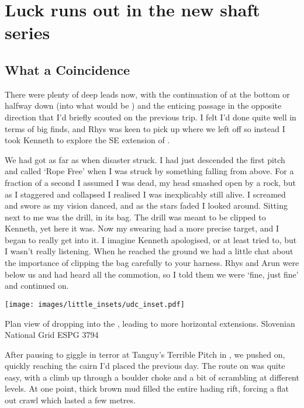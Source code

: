 \section{Luck runs out in the new shaft series}

\subsection{What a Coincidence}
There were plenty of deep leads now, with the continuation of  at the bottom or halfway down (into what would be ) and the enticing passage in the opposite direction that I’d briefly scouted on the previous trip. I felt I’d done quite well in terms of big finds, and Rhys was keen to pick up where we left off so instead I took Kenneth to explore the SE extension of .
 
We had got as far as  when disaster struck. I had just descended the first pitch and called ‘Rope Free’ when I was struck by something falling from above. For a fraction of a second I assumed I was dead, my head smashed open by a rock, but as I staggered and collapsed I realised I was inexplicably still alive. I screamed and swore as my vision danced, and as the stars faded I looked around. Sitting next to me was the drill, in its bag. The drill was meant to be clipped to Kenneth, yet here it was. Now my swearing had a more precise target, and I began to really get into it. I imagine Kenneth apologised, or at least tried to, but I wasn’t really listening. When he reached the ground we had a little chat about the importance of clipping the bag carefully to your harness. Rhys and Arun were below us and had heard all the commotion, so I told them we were ‘fine, just fine’ and continued on.


\begin{marginfigure}
\checkoddpage \ifoddpage \forcerectofloat \else \forceversofloat \fi
\centering
 \texttt{[image: images/little\_insets/udc\_inset.pdf]}
 \caption{Plan view of \protect{} dropping into the \protect{}, leading to more horizontal extensions. Slovenian National Grid ESPG 3794}
 \label{Upside Down inset}
\end{marginfigure}

After pausing to giggle in terror at Tanguy’s Terrible Pitch in , we pushed on, quickly reaching the cairn I’d placed the previous day. The route on was quite easy, with a climb up through a boulder choke and a bit of scrambling at different levels. At one point, thick brown mud filled the entire hading rift, forcing a flat out crawl which lasted a few metres.
 
